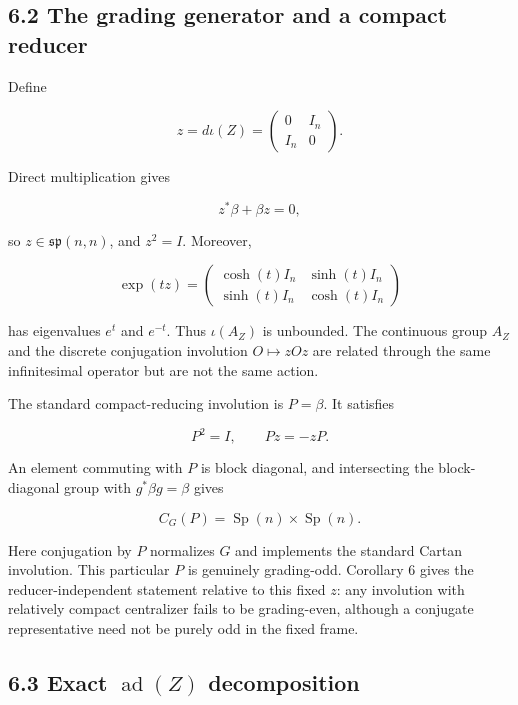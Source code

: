 \documentclass[
  10pt,
  letterpaper,
  oneside]{scrartcl}
\begin{document}
\subsection{6.2 The grading generator and a compact
reducer}\label{the-grading-generator-and-a-compact-reducer}

Define

\[
z=d\iota(Z)=
\begin{pmatrix}
0&I_n\\
I_n&0
\end{pmatrix}.
\]

Direct multiplication gives

\[
z^*\beta+\beta z=0,
\]

so \(z\in\mathfrak{sp}(n,n)\), and \(z^2=I\). Moreover,

\[
\exp(tz)=
\begin{pmatrix}
\cosh(t)I_n&\sinh(t)I_n\\
\sinh(t)I_n&\cosh(t)I_n
\end{pmatrix}
\]

has eigenvalues \(e^t\) and \(e^{-t}\). Thus \(\iota(A_Z)\) is
unbounded. The continuous group \(A_Z\) and the discrete conjugation
involution \(O\mapsto zOz\) are related through the same infinitesimal
operator but are not the same action.

The standard compact-reducing involution is \(P=\beta\). It satisfies

\[
P^2=I,
\qquad
Pz=-zP.
\]

An element commuting with \(P\) is block diagonal, and intersecting the
block-diagonal group with \(g^*\beta g=\beta\) gives

\[
C_G(P)=\operatorname{Sp}(n)\times\operatorname{Sp}(n).
\]

Here conjugation by \(P\) normalizes \(G\) and implements the standard
Cartan involution. This particular \(P\) is genuinely grading-odd.
Corollary 6 gives the reducer-independent statement relative to this
fixed \(z\): any involution with relatively compact centralizer fails to
be grading-even, although a conjugate representative need not be purely
odd in the fixed frame.

\subsection{\texorpdfstring{6.3 Exact \(\operatorname{ad}(Z)\)
decomposition}{6.3 Exact \textbackslash operatorname\{ad\}(Z) decomposition}}\label{exact-operatornameadz-decomposition}
\end{document}
